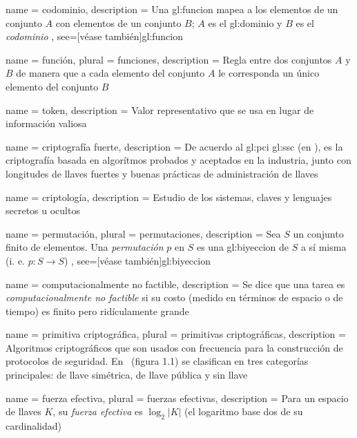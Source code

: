{
  name = codominio,
  description = {
    Una \gls{gl:funcion} mapea a los elementos de un conjunto $A$ con elementos
    de un conjunto $B$; $A$ es el \gls{gl:dominio} y $B$ es el
    \textit{codominio}%
  },
  see=[véase también]{gl:funcion}
}

{
  name = función,
  plural = funciones,
  description = {
    Regla entre dos conjuntos $A$ y $B$ de manera que a cada elemento del
    conjunto $A$ le corresponda un único elemento del conjunto $B$%
  }
}

{
  name = token,
  description = {
    Valor representativo que se usa en lugar de información valiosa%
  }
}

{
  name = criptografía fuerte,
  description = {
    De acuerdo al \gls{gl:pci} \gls{gl:ssc} (en \cite{dss_glosario}), es la
    criptografía basada en algorítmos probados y aceptados en la industria,
    junto con longitudes de llaves fuertes y buenas prácticas de
    administración de llaves%
  }
}

{
  name = criptología,
  description = {
    Estudio de los sistemas, claves y lenguajes secretos u ocultos%
  }
}

{
  name = permutación,
  plural = permutaciones,
  description = {
    Sea $ S $ un conjunto finito de elementos. Una \textit{permutación} $ p $
    en $ S $ es una \gls{gl:biyeccion} de $ S $ a sí misma (i. e.
    $ p: S \rightarrow S $)%
  },
  see=[véase también]{gl:biyeccion}
}

{
  name = computacionalmente no factible,
  description = {
    Se dice que una tarea es \textit{computacionalmente no factible} si su
    costo (medido en términos de espacio o de tiempo) es finito pero
    ridículamente grande%
  }
}

{
  name = primitiva criptográfica,
  plural = primitivas criptográficas,
  description = {
    Algoritmos criptográficos que son usados con frecuencia para la
    construcción de protocolos de seguridad. En~\cite{menezes} (figura 1.1)
    se clasifican en tres categorías principales: de llave simétrica, de
    llave pública y sin llave%
  }
}

{
  name = fuerza efectiva,
  plural = fuerzas efectivas,
  description = {
    Para un espacio de llaves $ K $, su \textit{fuerza efectiva} es
    $ \log_2 | K | $ (el logaritmo base dos de su cardinalidad)%
  }
}

